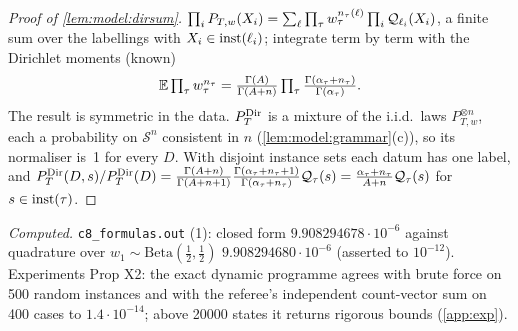 \begin{table}[ht]
\caption{Likelihoods and scores. Normalisers are data-independent. ``yes'': \cref{prop:model:whichsize}(a); ``restricted'': \cref{rem:model:graded}; ``no'': \cref{prop:model:whichsize}(b). $^\dagger$A fixed probability on $\mathcal S$, so \cref{lem:model:size} applies as in the proof of \cref{prop:model:whichsize}(a). $^\ddagger$A fixed sub-probability, so \cref{thm:univ:size} applies. $^\S$Only $(1-\varepsilon)P_T$ separates theories that refute no datum; at $\varepsilon=1$ nothing is learned (\cref{prop:pa:nc}). $^\P$With full-support noise (or a full-support channel, \cref{rem:ident:nearmiss}) $\operatorname{supp}P^\eta_{T^*}=\mathcal S$, so no competitor puts mass outside the data's support and \cref{lem:model:size} says nothing; theories are separated only through $\KL$. The marks say that mass outside the data's support is lost, not how strongly two theories are separated.}
\label{tab:model:likelihoods}
\end{table}

\begin{proof}[Proof of \cref{lem:model:dirsum}]
$\prod_iP_{T,w}(X_i)=\sum_\ell\prod_\tau w_\tau^{n_\tau(\ell)}\prod_i\mathcal{Q}_{\ell_i}(X_i)$, a finite sum over the labellings with $X_i\in\mathrm{inst}(\ell_i)$; integrate term by term with the Dirichlet moments (known)
\[\mathbb{E}\textstyle\prod_\tau w_\tau^{n_\tau}=\frac{\Gamma(A)}{\Gamma(A+n)}\prod_\tau\frac{\Gamma(\alpha_\tau+n_\tau)}{\Gamma(\alpha_\tau)}.\] The result is symmetric in the data. $P^{\mathrm{Dir}}_{T}$ is a mixture of the i.i.d.\ laws $P_{T,w}^{\otimes n}$, each a probability on $\mathcal S^n$ consistent in $n$ (\cref{lem:model:grammar}(c)), so its normaliser is~1 for every $D$. With disjoint instance sets each datum has one label, and $P^{\mathrm{Dir}}_{T}(D,s)/P^{\mathrm{Dir}}_{T}(D)=\frac{\Gamma(A+n)}{\Gamma(A+n+1)}\frac{\Gamma(\alpha_\tau+n_\tau+1)}{\Gamma(\alpha_\tau+n_\tau)}\mathcal{Q}_\tau(s)=\frac{\alpha_\tau+n_\tau}{A+n}\mathcal{Q}_\tau(s)$ for $s\in\mathrm{inst}(\tau)$.
\end{proof}

\emph{Computed.} \texttt{c8\_formulas.out} (1): closed form $9.908294678\cdot10^{-6}$ against quadrature over $w_1\sim\mathrm{Beta}(\tfrac12,\tfrac12)$ $9.908294680\cdot10^{-6}$ (asserted to $10^{-12}$). Experiments Prop X2: the exact dynamic programme agrees with brute force on 500 random instances and with the referee's independent count-vector sum on 400 cases to $1.4\cdot10^{-14}$; above 20000 states it returns rigorous bounds (\cref{app:exp}).

